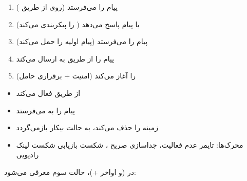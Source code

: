 \CNchained{}

\begin{enumerate}
\def\labelenumi{\arabic{enumi}.}
\tightlist
\item
   پیام  را می‌فرستد (روی  از طریق )
\item
   با پیام  پاسخ می‌دهد ( را پیکربندی می‌کند)
\item
   پیام  را می‌فرستد (پیام  اولیه را حمل می‌کند)
\item
   پیام  را از طریق  به  ارسال می‌کند
\item
   را آغاز می‌کند (امنیت + برقراری حامل)
\end{enumerate}


\begin{itemize}
\tightlist
\item
   از طریق  فعال می‌کند
\item
   پیام  را به  می‌فرستد
\item
   زمینه  را حذف می‌کند، به حالت بیکار بازمی‌گردد
\item
  محرک‌ها: تایمر عدم فعالیت، جداسازی صریح ، شکست بازیابی شکست لینک رادیویی
\end{itemize}



در  (و  اواخر +)، حالت سوم معرفی می‌شود:


